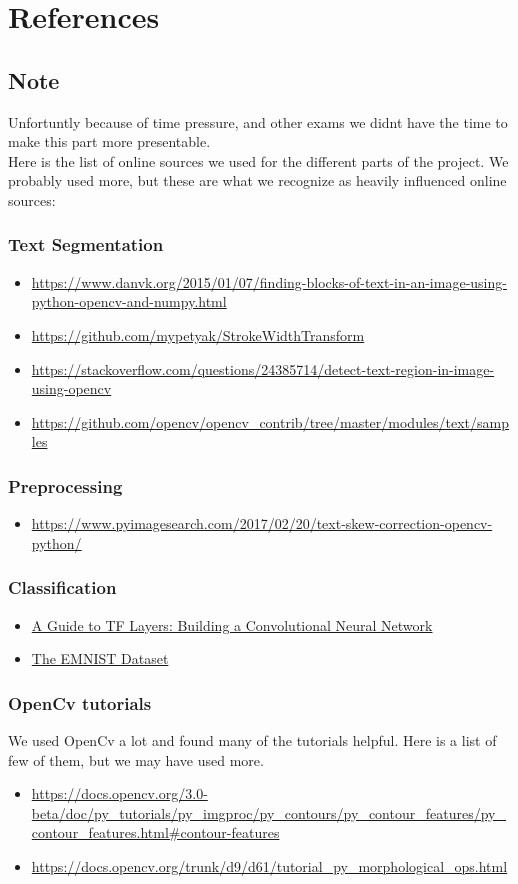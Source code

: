 \documentclass[Report.tex]{subfiles}
\begin{document}
\chapter{References}
\label{chap:References}
\section{Note}
Unfortuntly because of time pressure, and other exams we didnt have the time to make this part more presentable. \\
Here is the list of online sources we used for the different parts of the project. We probably used more, but these are what we recognize as heavily influenced online sources:

\subsection{Text Segmentation}
\begin{itemize}
    \item \url{https://www.danvk.org/2015/01/07/finding-blocks-of-text-in-an-image-using-python-opencv-and-numpy.html}
    \item \url{https://github.com/mypetyak/StrokeWidthTransform}
    \item \url{https://stackoverflow.com/questions/24385714/detect-text-region-in-image-using-opencv}
    \item \url{https://github.com/opencv/opencv_contrib/tree/master/modules/text/samples}
\end{itemize}
\subsection{Preprocessing}
\begin{itemize}
    \item \url{https://www.pyimagesearch.com/2017/02/20/text-skew-correction-opencv-python/}
\end{itemize}
\subsection{Classification}
\begin{itemize}
    \item \href{https://www.tensorflow.org/tutorials/layers}{A Guide to TF Layers: Building a Convolutional Neural Network}
    \item \href{https://www.nist.gov/itl/iad/image-group/emnist-dataset}{The EMNIST Dataset}
\end{itemize}

\subsection{OpenCv tutorials}
We used OpenCv a lot and found many of the tutorials helpful. Here is a list of few of them, but we may have used more.
\begin{itemize}
    \item \url{https://docs.opencv.org/3.0-beta/doc/py_tutorials/py_imgproc/py_contours/py_contour_features/py_contour_features.html#contour-features}
    \item \url{https://docs.opencv.org/trunk/d9/d61/tutorial_py_morphological_ops.html}
\end{itemize}
\end{document}
